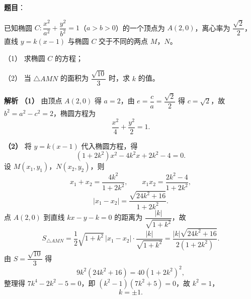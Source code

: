 \begin{answer}

\textbf{题目}：

已知椭圆 $C:\dfrac{x^2}{a^2}+\dfrac{y^2}{b^2}=1$（$a>b>0$）的一个顶点为 $A(2,0)$，离心率为 $\dfrac{\sqrt2}2$，直线 $y=k(x-1)$ 与椭圆 $C$ 交于不同的两点 $M$，$N$。

（1） 求椭圆 $C$ 的方程；

（2） 当 $\triangle AMN$ 的面积为 $\dfrac{\sqrt{10}}3$ 时，求 $k$ 的值。

\textbf{解析}
\textbf{（1）} 由顶点 $A(2,0)$ 得 $a=2$，由 $e=\dfrac ca=\dfrac{\sqrt2}2$ 得 $c=\sqrt2$，故 $b^2=a^2-c^2=2$，椭圆方程为
\nopagebreak[4]
\[\frac{x^2}4+\frac{y^2}2=1.\]

\textbf{（2）} 将 $y=k(x-1)$ 代入椭圆方程，得
\nopagebreak[4]
\[(1+2k^2)x^2-4k^2x+2k^2-4=0.\]
设 $M(x_1,y_1)$，$N(x_2,y_2)$，则
\nopagebreak[4]
\[x_1+x_2=\frac{4k^2}{1+2k^2},\qquad x_1x_2=\frac{2k^2-4}{1+2k^2},\]
\nopagebreak[4]
\[|x_1-x_2|=\frac{\sqrt{24k^2+16}}{1+2k^2}.\]
点 $A(2,0)$ 到直线 $kx-y-k=0$ 的距离为 $\dfrac{|k|}{\sqrt{1+k^2}}$，故
\nopagebreak[4]
\[S_{\triangle AMN}=\frac12\sqrt{1+k^2}\,|x_1-x_2|\cdot\frac{|k|}{\sqrt{1+k^2}}=\frac{|k|\sqrt{24k^2+16}}{2(1+2k^2)}.\]
由 $S=\dfrac{\sqrt{10}}3$ 得
\nopagebreak[4]
\[9k^2(24k^2+16)=40(1+2k^2)^2,\]
整理得 $7k^4-2k^2-5=0$，即 $(k^2-1)(7k^2+5)=0$，故 $k^2=1$，
\nopagebreak[4]
\[k=\pm1.\]



\end{answer}
